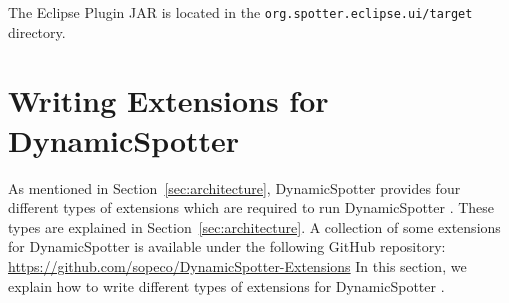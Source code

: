 \documentclass{report}
\newcommand{\DS}{DynamicSpotter }
\newcommand{\link}[1]{\textcolor[rgb]{0.0,0.0,1.0}{\href{#1}{#1}}}
\begin{document}
The Eclipse Plugin JAR is located in the \texttt{org.spotter.eclipse.ui/target} directory.


\newpage
\section{Writing Extensions for \DS}
\label{sec:extensions}
As mentioned in Section~\ref{sec:architecture}, \DS provides four different types of extensions which are required to
run \DS. These types are explained in Section~\ref{sec:architecture}. A collection of some extensions for \DS is
available under the following GitHub repository:
\newline
\newline
\link{https://github.com/sopeco/DynamicSpotter-Extensions}
\newline
\newline
In this section, we explain how to write different types of extensions for \DS.
\end{document}
